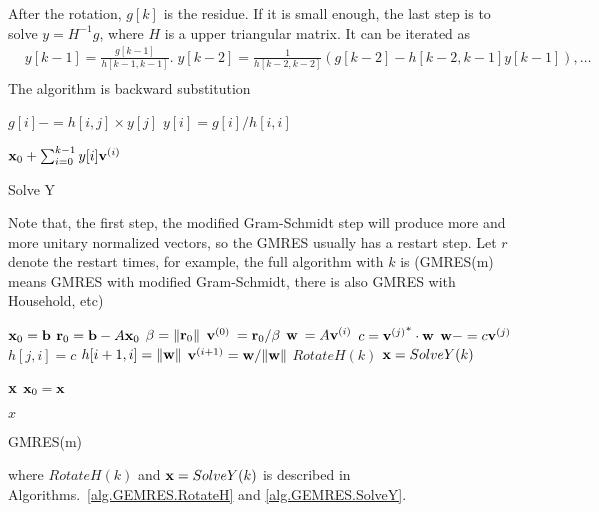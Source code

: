 After the rotation, $g[k]$ is the residue. If it is small enough, the last step is to solve $y=H^{-1}g$, where $H$ is a upper triangular matrix. It can be iterated as
\begin{equation}
\begin{split}
&y[k-1]=\frac{g[k-1]}{h[k-1,k-1]}.\;y[k-2]=\frac{1}{h[k-2,k-2]}\left(g[k-2]-h[k-2,k-1]y[k-1]\right),\ldots\\
\end{split}
\end{equation}
The algorithm is backward substitution
\begin{algorithm}[H]
\begin{algorithmic}
        \State $g[i]-=h[i,j]\times y[j]$
    \EndFor
    \State $y[i] = g[i] / h[i,i]$
\EndFor

\Return ${\bf x}_0+\sum _{i=0}^{k-1}y[i]{\bf v}^{(i)}$
\end{algorithmic}
\caption{\label{alg.GEMRES.SolveY}Solve Y}
\end{algorithm}

Note that, the first step, the modified Gram-Schmidt step will produce more and more unitary normalized vectors, so the GMRES usually has a restart step. Let $r$ denote the restart times, for example, the full algorithm with $k$ is (GMRES(m) means GMRES with modified Gram-Schmidt, there is also GMRES with Household, etc)
\begin{algorithm}[H]
\begin{algorithmic}
\State ${\bf x}_0={\bf b}$
    \State ${\bf r}_0={\bf b}-A{\bf x}_0$
    \State $\beta = \|{\bf r}_0\|$
    \State ${\bf v}^{(0)}\:={\bf r}_0/\beta$
        \State ${\bf w}\:=A{\bf v}^{(i)}$
            \State $c={{\bf v}^{(j)}}^*\cdot {\bf w}$
            \State ${\bf w}-=c{\bf v}^{(j)}$
            \State $h[j,i]=c$
        \EndFor
        \State $h[i+1,i]=\|{\bf w}\|$
        \State ${\bf v}^{(i+1)}={\bf w}/\|{\bf w}\|$
    \EndFor
    \State $RotateH(k)$
    \State ${\bf x}=SolveY(k)$

        \Return ${\bf x}$
    \EndIf
    \State ${\bf x}_0={\bf x}$
\EndFor

\Return $x$
\end{algorithmic}
\caption{GMRES(m)}
\end{algorithm}
where $RotateH(k)$ and ${\bf x}=SolveY(k)$ is described in Algorithms.~\ref{alg.GEMRES.RotateH} and \ref{alg.GEMRES.SolveY}.


